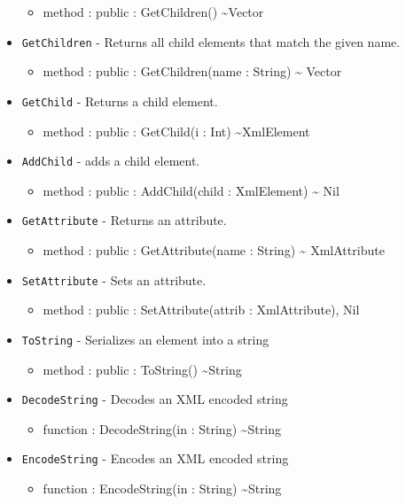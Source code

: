 \documentclass[11pt]{article}
\begin{document}
\begin{itemize}
  \begin{itemize}
  \item method : public : GetChildren() \textasciitilde Vector
  \end{itemize}
\item \texttt{GetChildren} - Returns all child elements that match the
  given name.
  \begin{itemize}
  \item method : public : GetChildren(name : String) \textasciitilde
    Vector
  \end{itemize}
\item \texttt{GetChild} - Returns a child element.
  \begin{itemize}
  \item method : public : GetChild(i : Int) \textasciitilde XmlElement
  \end{itemize}
\item \texttt{AddChild} - adds a child element.
  \begin{itemize}
  \item method : public : AddChild(child : XmlElement) \textasciitilde
    Nil
  \end{itemize}
\item \texttt{GetAttribute} - Returns an attribute.
  \begin{itemize}
  \item method : public : GetAttribute(name : String) \textasciitilde
    XmlAttribute
  \end{itemize}
\item \texttt{SetAttribute} - Sets an attribute.
  \begin{itemize}
  \item method : public : SetAttribute(attrib : XmlAttribute),
    Nil
  \end{itemize}
\item \texttt{ToString} - Serializes an element into a string
  \begin{itemize}
  \item method : public : ToString() \textasciitilde String
  \end{itemize}
\item \texttt{DecodeString} - Decodes an XML encoded string
  \begin{itemize}
  \item function : DecodeString(in : String) \textasciitilde String
  \end{itemize}
\item \texttt{EncodeString} - Encodes an XML encoded string
  \begin{itemize}
  \item function : EncodeString(in : String) \textasciitilde String
  \end{itemize}
\end{itemize}
\end{document}
